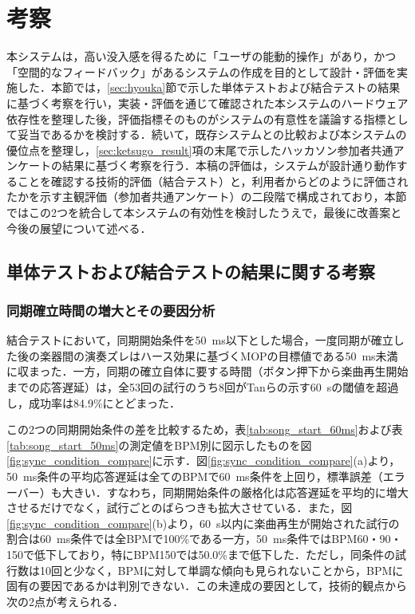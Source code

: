 \section{考察}
\label{sec:kousatsu}

本システムは，高い没入感を得るために「ユーザの能動的操作」があり，かつ「空間的なフィードバック」があるシステムの作成を目的として設計・評価を実施した．本節では，\ref{sec:hyouka}節で示した単体テストおよび結合テストの結果に基づく考察を行い，実装・評価を通じて確認された本システムのハードウェア依存性を整理した後，評価指標そのものがシステムの有意性を議論する指標として妥当であるかを検討する．続いて，既存システムとの比較および本システムの優位点を整理し，\ref{sec:ketsugo_result}項の末尾で示したハッカソン参加者共通アンケートの結果に基づく考察を行う．本稿の評価は，システムが設計通り動作することを確認する技術的評価（結合テスト）と，利用者からどのように評価されたかを示す主観評価（参加者共通アンケート）の二段階で構成されており，本節ではこの2つを統合して本システムの有効性を検討したうえで，最後に改善案と今後の展望について述べる．

\subsection{単体テストおよび結合テストの結果に関する考察}
\label{sec:kousatsu_test}

\subsubsection{同期確立時間の増大とその要因分析}
\label{sec:kousatsu_douki}

結合テストにおいて，同期開始条件を\SI{50}{ms}以下とした場合，一度同期が確立した後の楽器間の演奏ズレはハース効果\cite{haas1951}に基づくMOPの目標値である\SI{50}{ms}未満に収まった．一方，同期の確立自体に要する時間（ボタン押下から楽曲再生開始までの応答遅延）は，全53回の試行のうち8回がTanらの示す\SI{60}{s}\cite{tan2026}の閾値を超過し，成功率は84.9\%にとどまった．

この2つの同期開始条件の差を比較するため，表\ref{tab:song_start_60ms}および表\ref{tab:song_start_50ms}の測定値をBPM別に図示したものを図\ref{fig:sync_condition_compare}に示す．図\ref{fig:sync_condition_compare}(a)より，\SI{50}{ms}条件の平均応答遅延は全てのBPMで\SI{60}{ms}条件を上回り，標準誤差（エラーバー）も大きい．すなわち，同期開始条件の厳格化は応答遅延を平均的に増大させるだけでなく，試行ごとのばらつきも拡大させている．また，図\ref{fig:sync_condition_compare}(b)より，\SI{60}{s}以内に楽曲再生が開始された試行の割合は\SI{60}{ms}条件では全BPMで100\%である一方，\SI{50}{ms}条件ではBPM60・90・150で低下しており，特にBPM150では50.0\%まで低下した．ただし，同条件の試行数は10回と少なく，BPMに対して単調な傾向も見られないことから，BPMに固有の要因であるかは判別できない．この未達成の要因として，技術的観点から次の2点が考えられる．

